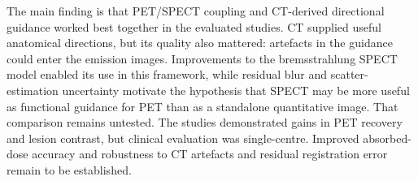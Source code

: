 The main finding is that PET/SPECT coupling and CT-derived directional guidance worked best together in the evaluated studies. CT supplied useful anatomical directions, but its quality also mattered: artefacts in the guidance could enter the emission images. Improvements to the bremsstrahlung SPECT model enabled its use in this framework, while residual blur and scatter-estimation uncertainty motivate the hypothesis that SPECT may be more useful as functional guidance for PET than as a standalone quantitative image. That comparison remains untested. The studies demonstrated gains in PET recovery and lesion contrast, but clinical evaluation was single-centre. Improved absorbed-dose accuracy and robustness to CT artefacts and residual registration error remain to be established.
